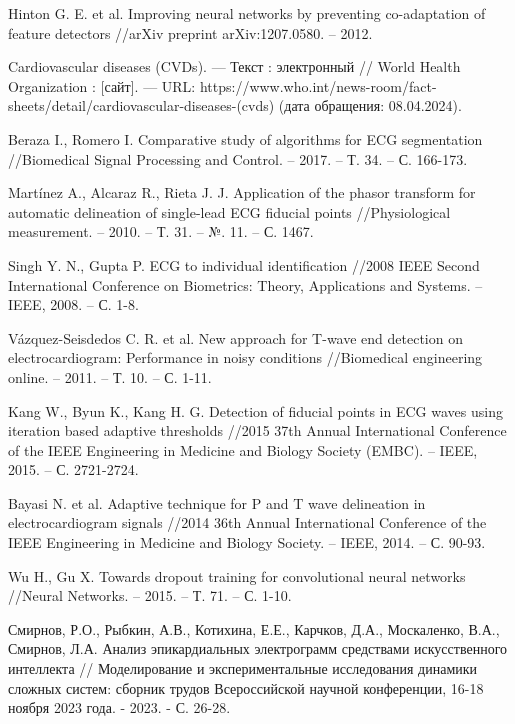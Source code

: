 \begin{thebibliography}{00}
	Hinton G. E. et al. Improving neural networks by preventing co-adaptation
	of feature detectors //arXiv preprint arXiv:1207.0580. – 2012.

	Cardiovascular diseases (CVDs). --- Текст : электронный // World Health
	Organization : [сайт]. --- URL:
	https://www.who.int/news-room/fact-sheets/detail/cardiovascular-diseases-(cvds)
	(дата обращения: 08.04.2024).

	Beraza I., Romero I. Comparative study of algorithms for ECG segmentation
	//Biomedical Signal Processing and Control. – 2017. – Т. 34. – С. 166-173.

	Martínez A., Alcaraz R., Rieta J. J. Application of the phasor transform
	for automatic delineation of single-lead ECG fiducial points
	//Physiological measurement. – 2010. – Т. 31. – №. 11. – С. 1467.

	Singh Y. N., Gupta P. ECG to individual identification //2008 IEEE Second
	International Conference on Biometrics: Theory, Applications and Systems. –
	IEEE, 2008. – С. 1-8.

	Vázquez-Seisdedos C. R. et al. New approach for T-wave end detection on
	electrocardiogram: Performance in noisy conditions //Biomedical engineering
	online. – 2011. – Т. 10. – С. 1-11.

	Kang W., Byun K., Kang H. G. Detection of fiducial points in ECG waves
	using iteration based adaptive thresholds //2015 37th Annual International
	Conference of the IEEE Engineering in Medicine and Biology Society (EMBC).
	– IEEE, 2015. – С. 2721-2724.

	Bayasi N. et al. Adaptive technique for P and T wave delineation in
	electrocardiogram signals //2014 36th Annual International Conference of
	the IEEE Engineering in Medicine and Biology Society. – IEEE, 2014. – С.
	90-93.

	Wu H., Gu X. Towards dropout training for convolutional neural networks
	//Neural Networks. – 2015. – Т. 71. – С. 1-10.

	Смирнов, Р.О., Рыбкин, А.В., Котихина, Е.Е., Карчков, Д.А., Москаленко,
	В.А., Смирнов, Л.А. Анализ эпикардиальных электрограмм средствами
	искусственного интеллекта // Моделирование и экспериментальные исследования
	динамики сложных систем: сборник трудов Всероссийской научной конференции,
	16-18 ноября 2023 года. - 2023. - С. 26-28.


\end{thebibliography}
